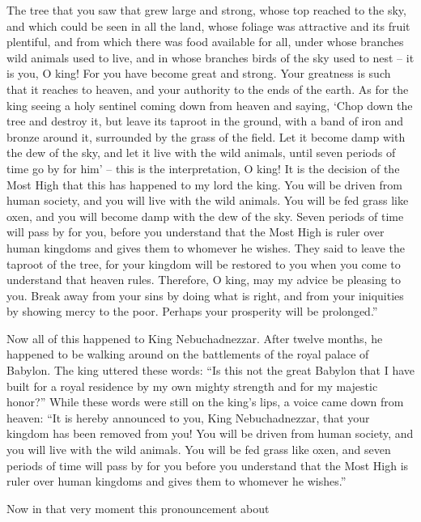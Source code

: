 {The tree
that
you saw
that
grew
large and strong,
whose top
reached
to the sky,
and which could be seen
in all
the land,
whose foliage
was attractive
and its fruit
plentiful,
and from which there was food
available for all,
under
whose branches wild
animals
used to live,
and in whose branches
birds
of the sky
used to nest –
it
is you,
O king! For
you have become great
and strong.
Your greatness
is such that
it reaches
to heaven,
and your authority
to the ends
of the earth.
As for
the king
seeing
a holy
sentinel
coming down
from
heaven
and saying,
‘Chop down
the tree
and destroy
it, but
leave
its taproot
in the ground,
with a band
of iron
and bronze
around it, surrounded by the grass
of the field.
Let it become damp
with the dew
of the sky,
and let it live with
the wild
animals,
until
seven
periods
of time
go by
for him’ –
this
is the interpretation,
O king! It is the decision
of the Most High
that
this has
happened
to
my lord
the king.
You will be driven
from
human society,
and you will
live
with
the wild
animals.
You will be fed
grass
like oxen,
and you will become damp
with the dew
of the sky.
Seven periods
of time
will pass
by for
you, before
you understand
that
the Most High
is ruler
over human
kingdoms
and gives
them to whomever
he wishes.
They said
to leave
the taproot
of the tree,
for your kingdom
will be restored
to
you when
you come to understand
that
heaven
rules.
Therefore,
O king,
may my advice
be pleasing
to you. Break away
from
your sins
by doing what is right,
and from your iniquities
by showing mercy
to the poor.
Perhaps
your prosperity
will be
prolonged.”
\par }{\PP {}Now all
of this happened
to
King
Nebuchadnezzar.
After
twelve
months,
he happened to be
walking around
on the battlements
of the royal
palace
of Babylon.
The king
uttered
these words: “Is
this
not
the great
Babylon
that
I
have built
for a royal
residence
by my own mighty
strength
and for my majestic
honor?”
While
these words
were still on the king’s
lips,
a voice
came down
from
heaven: “It is hereby announced
to you, King
Nebuchadnezzar,
that your kingdom
has been removed
from you!
You will be driven
from
human society,
and you will live
with
the wild
animals.
You will be fed
grass
like oxen,
and seven periods
of time
will pass
by for
you before
you understand
that
the Most High
is ruler
over human
kingdoms
and gives
them to whomever
he wishes.”
\par }{\PP {}Now in that very moment
this pronouncement
about
}
